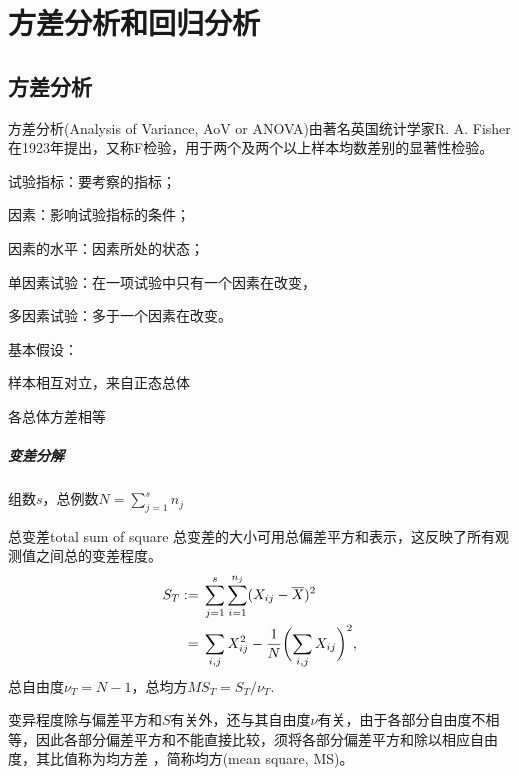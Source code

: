 \chapter{方差分析和回归分析}

\section{方差分析}

方差分析(Analysis of Variance, AoV or ANOVA)由著名英国统计学家R. A. Fisher在1923年提出，又称F检验，用于两个及两个以上样本均数差别的显著性检验。

\begin{definition}{}{}
	试验指标：要考察的指标；

	因素：影响试验指标的条件；

	因素的水平：因素所处的状态；
	
	单因素试验：在一项试验中只有一个因素在改变，

	多因素试验：多于一个因素在改变。
\end{definition}

基本假设：
\begin{compactenum}
	\item 样本相互对立，来自正态总体
	\item 各总体方差相等
\end{compactenum}

\paragraph{变差分解}

组数$s$，总例数$N=\textstyle\sum_{j=1}^sn_j$

\begin{definition}{总变差}{total sum of square}
	总变差的大小可用总偏差平方和表示，这反映了所有观测值之间总的变差程度。
	\begin{align}
		S_T:={}&\sum_{j=1}^s\sum_{i=1}^{n_j}(X_{ij}-\overline{X})^2\\\notag
		={}&\sum_{i,j}X_{ij}^2-\frac1N\biggl(\sum_{i,j}X_{ij}\biggr)^2,
	\end{align}
	总自由度$\nu_T=N-1$，总均方$MS_T=S_T/\nu_T.$
\end{definition}

变异程度除与偏差平方和$S$有关外，还与其自由度$\nu$有关，由于各部分自由度不相等，因此各部分偏差平方和不能直接比较，须将各部分偏差平方和除以相应自由度，其比值称为均方差 ，简称均方(mean square, MS)。

